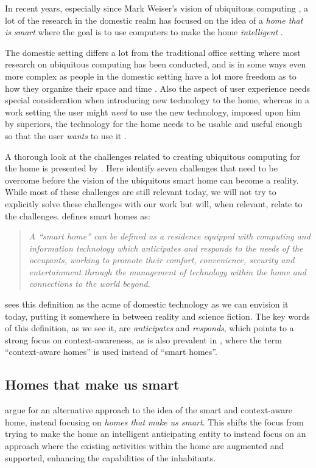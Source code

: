 In recent years, especially since Mark Weiser's vision of ubiquitous computing \citep{weiser1991computer}, a lot of the research in the domestic realm has focused on the idea of a \emph{home that is smart} where the goal is to use computers to make the home \emph{intelligent} \citep{taylor2007homes}.

The domestic setting differs a lot from the traditional office setting where most research on ubiquitous computing has been conducted, and is in some ways even more complex as people in the domestic setting have a lot more freedom as to how they organize their space and time \cite{meyer2003survey}.
Also the aspect of user experience needs special consideration when introducing new technology to the home, whereas in a work setting the user might \emph{need} to use the new technology, imposed upon him by superiors, the technology for the home needs to be usable and useful enough so that the user \emph{wants} to use it \citep{meyer2003survey}.

A thorough look at the challenges related to creating ubiquitous computing for the home is presented by \citet{edwards2001home}.
Here \citeauthor{edwards2001home} identify seven challenges that need to be overcome before the vision of the ubiquitous smart home can become a reality. 
While most of these challenges are still relevant today, we will not try to explicitly solve these challenges with our work but will, when relevant, relate to the challenges.
\blank
\citet{aldrich2003smart} defines smart homes as:

\begin{quotation}
\emph{A ``smart home'' can be defined as a residence equipped with computing and information technology which anticipates and responds to the needs of the occupants, working to promote their comfort, convenience, security and entertainment through the management of technology within the home and connections to the world beyond.}
\end{quotation}
\citeauthor{aldrich2003smart} sees this definition as the acme of domestic technology as we can envision it today, putting it somewhere in between reality and science fiction.
The key words of this definition, as we see it, are \emph{anticipates} and \emph{responds}, which points to a strong focus on context-awareness, as is also prevalent in \citep{meyer2003survey}, where the term ``context-aware homes'' is used instead of ``smart homes''. 

\subsection{Homes that make us smart}
\citet{taylor2007homes} argue for an alternative approach to the idea of the smart and context-aware home, instead focusing on \emph{homes that make us smart}. 
This shifts the focus from trying to make the home an intelligent anticipating entity to instead focus on an approach where the existing activities within the home are augmented and supported, enhancing the capabilities of the inhabitants.

